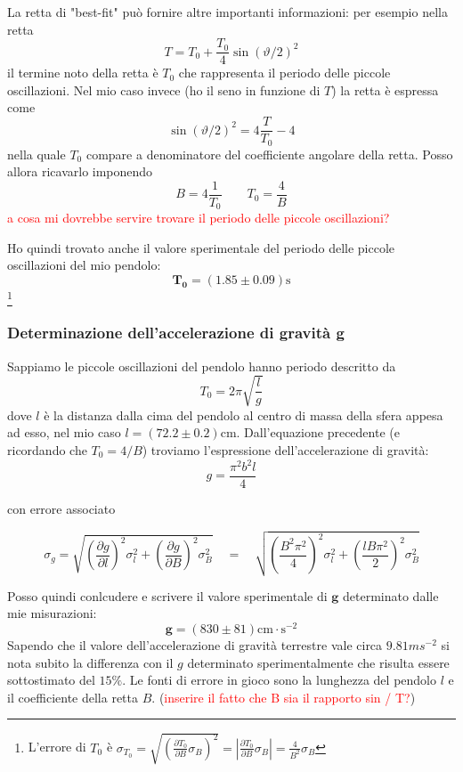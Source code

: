 \documentclass{article}
\begin{document}
\noindent
La retta di "best-fit" può fornire altre importanti informazioni: per esempio nella retta 
\[
T = T_0 + \frac{T_0}{4}\sin{\left(\vartheta/2\right)}^2
\]
il termine noto della retta è $T_0$ che rappresenta il periodo delle piccole oscillazioni. Nel mio caso invece (ho il seno in funzione di $T$) la retta è espressa come
\[
\sin{\left(\vartheta/2\right)}^2 = 4\frac{T}{T_0} - 4
\]
nella quale $T_0$ compare a denominatore del coefficiente angolare della retta. Posso allora ricavarlo imponendo
\[
B =  4\frac{1}{T_0} \qquad T_0 = \frac{4}{B} 
\]
\textcolor{red}{a cosa mi dovrebbe servire trovare il periodo delle piccole oscillazioni?}

\noindent
Ho quindi trovato anche il valore sperimentale del periodo delle piccole oscillazioni del mio pendolo:
\[
\mathbf{T_0} = (1.85 \pm 0.09)\text{s}
\]
\footnote{L'errore di $T_0$ è $\sigma_{T_0} = \sqrt{\left(\frac{\partial T_0}{\partial B}\sigma_{B}\right)^2} = \left|\frac{\partial T_0}{\partial B}\sigma_{B}\right| = \frac{4}{B^2}\sigma_B$}

\subsubsection{Determinazione dell'accelerazione di gravità g}
Sappiamo le piccole oscillazioni del pendolo hanno periodo descritto da
\[
T_0 = 2\pi \sqrt{\frac{l}{g}} 
\]
dove $l$ è la distanza dalla cima del pendolo al centro di massa della sfera appesa ad esso, nel mio caso $l = (72.2 \pm 0.2)$cm. Dall'equazione precedente (e ricordando che $T_0 = 4/B$) troviamo l'espressione dell'accelerazione di gravità:
\[
g = \frac{\pi^2b^2l}{4}
\]

con errore associato

\[
\sigma_g = \sqrt{\left(\frac{\partial g}{\partial l} \right)^2\sigma_l^2 + \left(\frac{\partial g}{\partial B} \right)^2 \sigma_B^2}  \quad = \quad 	\sqrt{\left(\frac{B^2\pi^2}{4}\right)^2 \sigma_l^2 + \left( \frac{lB\pi^2}{2}  \right)^2 \sigma_B^2}	 
\]


\noindent
Posso quindi conlcudere e scrivere il valore sperimentale di $\mathbf{g}$ determinato dalle mie misurazioni:
\[
\mathbf{g} = (830 \pm 81)\text{cm}\cdot \text{s}^{-2}
\]
\noindent
Sapendo che il valore dell'accelerazione di gravità terrestre vale circa $9.81ms^{-2}$ si nota subito la differenza con il $g$ determinato sperimentalmente che risulta essere sottostimato del $15\%$. Le fonti di errore in gioco sono la lunghezza del pendolo $l$ e il coefficiente della retta $B$. (\textcolor{red}{inserire il fatto che B sia il rapporto sin / T?})
\end{document}
